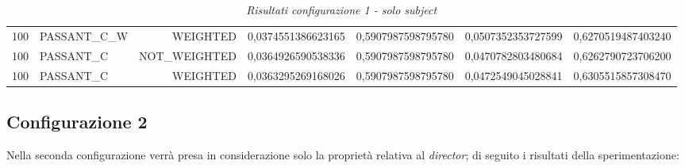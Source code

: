 \begin{table}[H]
{\begin{tabular}{ c l r c c c c }
	100 & PASSANT\_C\_W &   WEIGHTED & 0,0374551386623165 & 0,5907987598795780 & 0,0507352353727599 & 0,6270519487403240 \\
	
	100 &  PASSANT\_C & NOT\_WEIGHTED & 0,0364926590538336 & 0,5907987598795780 & 0,0470782803480684 & 0,6262790723706200 \\
	
	100 &  PASSANT\_C &   WEIGHTED & 0,0363295269168026 & 0,5907987598795780 & 0,0472549045028841 & 0,6305515857308470 \\
	\bottomrule
\end{tabular}  
}
\caption{\emph{Risultati configurazione 1 - solo subject}}
\end{table} 

\subsection{Configurazione 2}
Nella seconda configurazione verrà presa in considerazione solo la proprietà relativa al \emph{director}; di seguito i risultati della sperimentazione:

